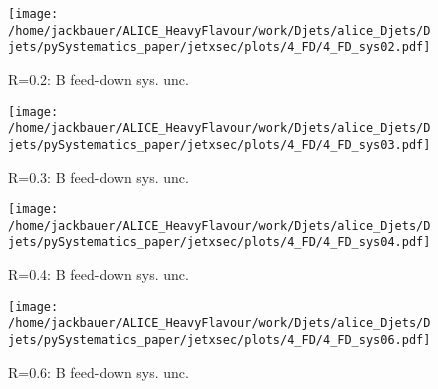 \begin{figure}
\centering
\begin{minipage}{.5\textwidth}
  \centering
  \texttt{[image: /home/jackbauer/ALICE\_HeavyFlavour/work/Djets/alice\_Djets/Djets/pySystematics\_paper/jetxsec/plots/4\_FD/4\_FD\_sys02.pdf]}
  \caption{R=0.2: B feed-down sys. unc.}%
  \label{fig:BFD_sysUnc_DzeroR02}
\end{minipage}%
\begin{minipage}{.5\textwidth}
  \centering
  \texttt{[image: /home/jackbauer/ALICE\_HeavyFlavour/work/Djets/alice\_Djets/Djets/pySystematics\_paper/jetxsec/plots/4\_FD/4\_FD\_sys03.pdf]}
  \caption{R=0.3: B feed-down sys. unc.}%
  \label{fig:BFD_sysUnc_DzeroR03}
\end{minipage}
\end{figure}
\begin{figure}
\centering
\begin{minipage}{.5\textwidth}
  \centering
  \texttt{[image: /home/jackbauer/ALICE\_HeavyFlavour/work/Djets/alice\_Djets/Djets/pySystematics\_paper/jetxsec/plots/4\_FD/4\_FD\_sys04.pdf]}
  \caption{R=0.4: B feed-down sys. unc.}%
  \label{fig:BFD_sysUnc_DzeroR04}
\end{minipage}%
\begin{minipage}{.5\textwidth}
  \centering
  \texttt{[image: /home/jackbauer/ALICE\_HeavyFlavour/work/Djets/alice\_Djets/Djets/pySystematics\_paper/jetxsec/plots/4\_FD/4\_FD\_sys06.pdf]}
  \caption{R=0.6: B feed-down sys. unc.}%
  \label{fig:BFD_sysUnc_DzeroR06}
\end{minipage}
\end{figure}
\clearpage
